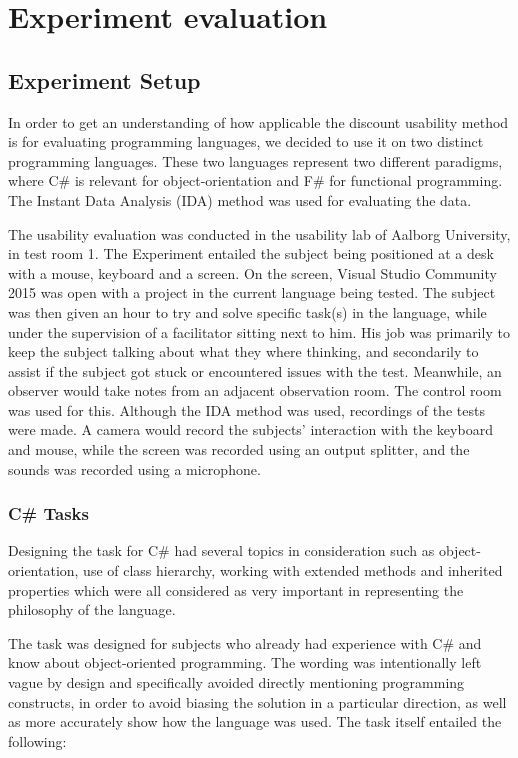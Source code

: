 \chapter{Experiment evaluation}
\label{chapter:ExperimenteEvaluation}
\section{Experiment Setup}
In order to get an understanding of how applicable the discount usability method is for evaluating programming languages, we decided to use it on two distinct programming languages. These two languages represent two different paradigms, where C\# is relevant for object-orientation and F\# for functional programming. The Instant Data Analysis (IDA) method\cite{IDA} was used for evaluating the data.

The usability evaluation was conducted in the usability lab of Aalborg University\cite{UsabilityLab}, in test room 1.
The Experiment entailed the subject being positioned at a desk with a mouse, keyboard and a screen.
On the screen, Visual Studio Community 2015 was open with a project in the current language being tested.
The subject was then given an hour to try and solve specific task(s) in the language, while under the supervision of a facilitator sitting next to him. His job was primarily to keep the subject talking about what they where thinking, and secondarily to assist if the subject got stuck or encountered issues with the test.
Meanwhile, an observer would take notes from an adjacent observation room. The control room was used for this.
Although the IDA method was used, recordings of the tests were made.
A camera would record the subjects' interaction with the keyboard and mouse, while the screen was recorded using an output splitter, and the sounds was recorded using a microphone.

\subsection{C\# Tasks}
\label{subsection:C Task}
Designing the task for C\# had several topics in consideration such as object-orientation, use of class hierarchy, working with extended methods and inherited properties which were all considered as very important in representing the philosophy of the language.  

The task was designed for subjects who already had experience with C\# and know about object-oriented programming.
The wording was intentionally left vague by design and specifically avoided directly mentioning programming constructs, in order to avoid biasing the solution in a particular direction, as well as more accurately show how the language was used. The task itself entailed the following:

